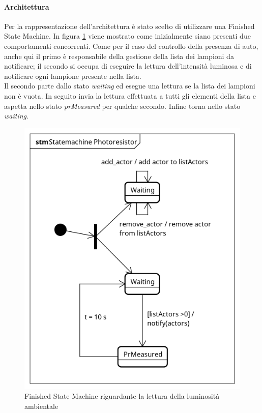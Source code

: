 \paragraph{Architettura}
Per la rappresentazione dell'architettura è stato scelto di utilizzare una Finished State Machine.
In figura \ref{FSM PR} viene mostrato come inizialmente siano presenti due comportamenti concorrenti.
Come per il caso del controllo della presenza di auto, anche qui il primo è responsabile della gestione della lista dei lampioni da notificare;
il secondo si occupa di eseguire la lettura dell'intensità luminosa e di notificare ogni lampione presente nella lista.
\\Il secondo parte dallo stato \textit{waiting} ed esegue una lettura se la lista dei lampioni non è vuota.
In seguito invia la lettura effettuata a tutti gli elementi della lista e aspetta nello stato \textit{prMeasured} per qualche secondo.
Infine torna nello stato \textit{waiting}.
\begin{figure}[tbp]
	\centering
	\includegraphics[scale=.8]{figure/Statemachine_Photoresistor.png}
	\caption{Finished State Machine riguardante la lettura della luminosità ambientale \label{FSM PR}}
\end{figure}

